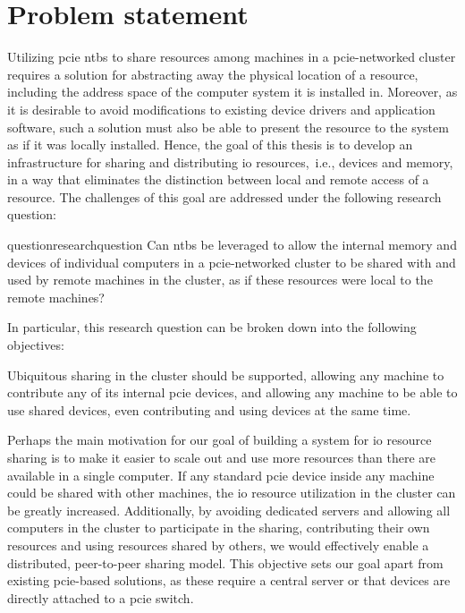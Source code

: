 \section{Problem statement}\label{sec:objectives}
%
Utilizing \gls{pcie} \glspl{ntb} to share resources among machines in a \gls{pcie}-networked cluster requires a solution for abstracting away the physical location of a resource, including the address space of the computer system it is installed in. Moreover, as it is desirable to avoid modifications to existing device drivers and application software, such a solution must also be able to present the resource to the system as if it was locally installed.
%
Hence, the goal of this thesis is to develop an infrastructure for sharing and distributing \gls{io} resources,~i.e., devices and memory, in a way that eliminates the distinction between local and remote access of a resource. The challenges of this goal are addressed under the following research question: 
\begin{restatable}{question}{researchquestion}
    Can \glspl{ntb} be leveraged to allow the internal memory and devices of individual computers in a \gls{pcie}-networked cluster to be shared with and used by remote machines in the cluster, as if these resources were local to the remote machines?
\end{restatable}
%
In particular, this research question can be broken down into the following objectives:
%
\begin{objective}\label{obj:distributed}
    Ubiquitous sharing in the cluster should be supported, allowing any machine to contribute any of its internal \gls{pcie} devices, and allowing any machine to be able to use shared devices, even contributing and using devices at the same time.
\end{objective}
Perhaps the main motivation for our goal of building a system for \gls{io} resource sharing is to make it easier to scale out and use more resources than there are available in a single computer. 
If any standard \gls{pcie} device inside any machine could be shared with other machines, the \gls{io} resource utilization in the cluster can be greatly increased.
Additionally, by avoiding dedicated servers and allowing all computers in the cluster to participate in the sharing, contributing their own resources and using resources shared by others, we would effectively enable a distributed, peer-to-peer sharing model. This objective sets our goal apart from existing \gls{pcie}-based solutions, as these require a central server or that devices are directly attached to a \gls{pcie} switch.




